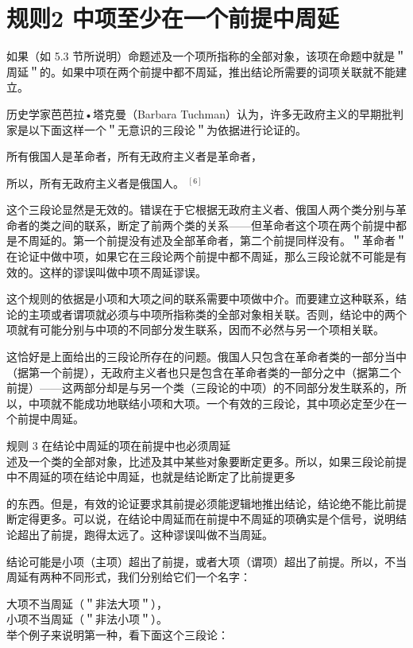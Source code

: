 \section*{规则2 中项至少在一个前提中周延}
如果（如 5.3 节所说明）命题述及一个项所指称的全部对象，该项在命题中就是＂周延＂的。如果中项在两个前提中都不周延，推出结论所需要的词项关联就不能建立。

历史学家芭芭拉•塔克曼（Barbara Tuchman）认为，许多无政府主义的早期批判家是以下面这样一个＂无意识的三段论＂为依据进行论证的。

\begin{displayquote}
所有俄国人是革命者，所有无政府主义者是革命者，
\end{displayquote}

\begin{displayquote}
所以，所有无政府主义者是俄国人。 ${ }^{[6]}$
\end{displayquote}

这个三段论显然是无效的。错误在于它根据无政府主义者、俄国人两个类分别与革命者的类之间的联系，断定了前两个类的关系——但革命者这个项在两个前提中都是不周延的。第一个前提没有述及全部革命者，第二个前提同样没有。＂革命者＂在论证中做中项，如果它在三段论两个前提中都不周延，那么三段论就不可能是有效的。这样的谬误叫做中项不周延谬误。

这个规则的依据是小项和大项之间的联系需要中项做中介。而要建立这种联系，结论的主项或者谓项就必须与中项所指称类的全部对象相关联。否则，结论中的两个项就有可能分别与中项的不同部分发生联系，因而不必然与另一个项相关联。

这恰好是上面给出的三段论所存在的问题。俄国人只包含在革命者类的一部分当中（据第一个前提），无政府主义者也只是包含在革命者类的一部分之中（据第二个前提）——这两部分却是与另一个类（三段论的中项）的不同部分发生联系的，所以，中项就不能成功地联结小项和大项。一个有效的三段论，其中项必定至少在一个前提中周延。

规则 3 在结论中周延的项在前提中也必须周延\\
述及一个类的全部对象，比述及其中某些对象要断定更多。所以，如果三段论前提中不周延的项在结论中周延，也就是结论断定了比前提更多

的东西。但是，有效的论证要求其前提必须能逻辑地推出结论，结论绝不能比前提断定得更多。可以说，在结论中周延而在前提中不周延的项确实是个信号，说明结论超出了前提，跑得太远了。这种谬误叫做不当周延。

结论可能是小项（主项）超出了前提，或者大项（谓项）超出了前提。所以，不当周延有两种不同形式，我们分别给它们一个名字：

大项不当周延（＂非法大项＂），\\
小项不当周延（＂非法小项＂）。\\
举个例子来说明第一种，看下面这个三段论：

